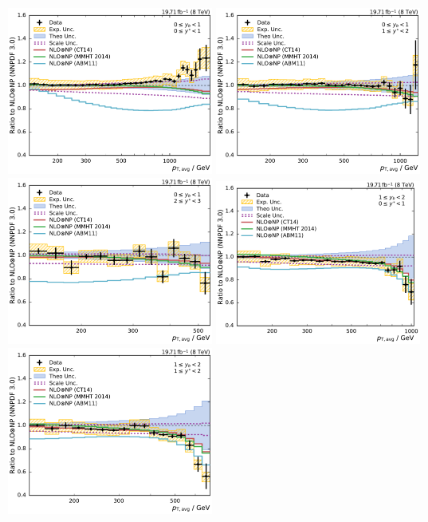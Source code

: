 \begin{figure}[htbp]
    \centering
    \includegraphics[width=0.48\textwidth]{figures/measurement/ratio_to_NNPDF30+np_totcomp_yb0ys0.pdf}\hfill
    \includegraphics[width=0.48\textwidth]{figures/measurement/ratio_to_NNPDF30+np_totcomp_yb0ys1.pdf}
    \includegraphics[width=0.48\textwidth]{figures/measurement/ratio_to_NNPDF30+np_totcomp_yb0ys2.pdf}\hfill
    \includegraphics[width=0.48\textwidth]{figures/measurement/ratio_to_NNPDF30+np_totcomp_yb1ys0.pdf}
    \includegraphics[width=0.48\textwidth]{figures/measurement/ratio_to_NNPDF30+np_totcomp_yb1ys1.pdf}\hfill

\end{figure}
